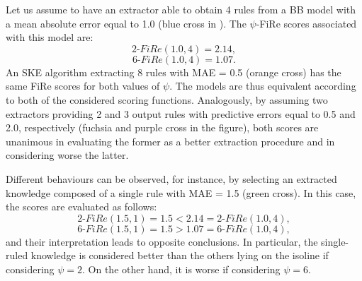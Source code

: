 \documentclass{article}
\newcommand{\fire}{FiRe}
\newcommand{\psifire}{$\psi$-\fire}
\begin{document}
Let us assume to have an extractor able to obtain 4 rules from a BB model with a mean absolute error equal to 1.0 (blue cross in ).
%
The \psifire{} scores associated with this model are:
%
\begin{equation*}
	2\textrm{-}\fire(1.0, 4)=2.14,
\end{equation*}
%
\begin{equation*}
	6\textrm{-}\fire(1.0, 4)=1.07.
\end{equation*}
%
An SKE algorithm extracting 8 rules with MAE = 0.5 (orange cross) has the same \fire{} scores for both values of $\psi$.
%
The models are thus equivalent according to both of the considered scoring functions.
%
Analogously, by assuming two extractors providing 2 and 3 output rules with predictive errors equal to 0.5 and 2.0, respectively (fuchsia and purple cross in the figure), both scores are unanimous in evaluating the former as a better extraction procedure and in considering worse the latter.

Different behaviours can be observed, for instance, by selecting an extracted knowledge composed of a single rule with MAE = 1.5 (green cross).
%
In this case, the scores are evaluated as follows:
%
\begin{equation*}
	2\textrm{-}\fire(1.5, 1)=1.5 < 2.14 = 2\textrm{-}\fire(1.0, 4),
\end{equation*}
%
\begin{equation*}
	6\textrm{-}\fire(1.5, 1)=1.5 > 1.07 = 6\textrm{-}\fire(1.0, 4),
\end{equation*}
%
and their interpretation leads to opposite conclusions.
%
In particular, the single-ruled knowledge is considered better than the others lying on the isoline if considering $\psi=2$.
%
On the other hand, it is worse if considering $\psi=6$.
\end{document}
